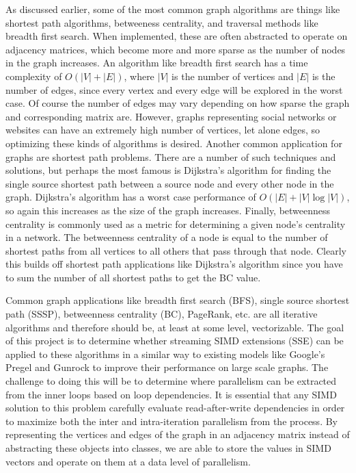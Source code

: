 \documentclass[conference]{IEEEtran}
\begin{document}
As discussed earlier, some of the most common graph algorithms are things like shortest path algorithms, betweeness centrality, and traversal methods like breadth first search.  When implemented, these are often abstracted to operate on adjacency matrices, which become more and more sparse as the number of nodes in the graph increases.  An algorithm like breadth first search has a time complexity of $O(|V| + |E|)$, where $|V|$ is the number of vertices and $|E|$ is the number of edges, since every vertex and every edge will be explored in the worst case.  Of course the number of edges may vary depending on how sparse the graph and corresponding matrix are.  However, graphs representing social networks or websites can have an extremely high number of vertices, let alone edges, so optimizing these kinds of algorithms is desired.  Another common application for graphs are shortest path problems.  There are a number of such techniques and solutions, but perhaps the most famous is Dijkstra's algorithm for finding the single source shortest path between a source node and every other node in the graph.  Dijkstra's algorithm has a worst case performance of $O(|E| + |V|\log|V|)$, so again this increases as the size of the graph increases.  Finally, betweenness centrality is commonly used as a metric for determining a given node's centrality in a network.  The betweenness centrality of a node is equal to the number of shortest paths from all vertices to all others that pass through that node.  Clearly this builds off shortest path applications like Dijkstra's algorithm since you have to sum the number of all shortest paths to get the BC value.  

Common graph applications like breadth first search (BFS), single source shortest path (SSSP), betweenness centrality (BC), PageRank, etc. are all iterative algorithms and therefore should be, at least at some level, vectorizable.  The goal of this project is to determine whether streaming SIMD extensions (SSE) can be applied to these algorithms in a similar way to existing models like Google's Pregel and Gunrock to improve their performance on large scale graphs.  The challenge to doing this will be to determine where parallelism can be extracted from the inner loops based on loop dependencies.  It is essential that any SIMD solution to this problem carefully evaluate read-after-write dependencies in order to maximize both the inter and intra-iteration parallelism from the process.  By representing the vertices and edges of the graph in an adjacency matrix instead of abstracting these objects into classes, we are able to store the values in SIMD vectors and operate on them at a data level of parallelism.  
\end{document}
